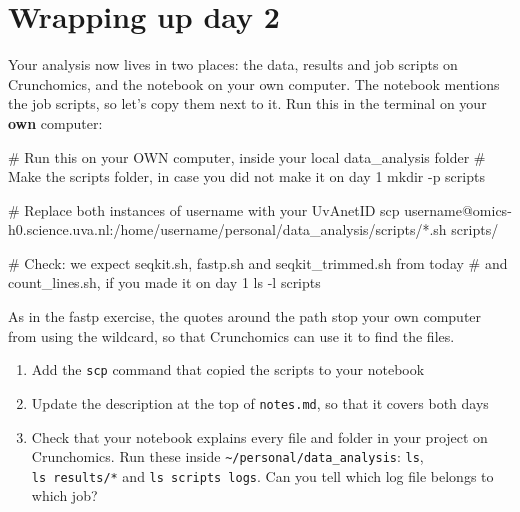 \documentclass[
  letterpaper,
  DIV=11,
  numbers=noendperiod]{scrreprt}
\newenvironment{Shaded}{}{}
\newcommand{\AttributeTok}[1]{\textcolor[rgb]{0.84,0.23,0.29}{#1}}
\newcommand{\CommentTok}[1]{\textcolor[rgb]{0.42,0.45,0.49}{#1}}
\newcommand{\FunctionTok}[1]{\textcolor[rgb]{0.44,0.26,0.76}{#1}}
\newcommand{\NormalTok}[1]{\textcolor[rgb]{0.14,0.16,0.18}{#1}}
\newcommand{\StringTok}[1]{\textcolor[rgb]{0.01,0.18,0.38}{#1}}
\providecommand{\tightlist}{%
  \setlength{\itemsep}{0pt}\setlength{\parskip}{0pt}}
\begin{document}
\section{Wrapping up day 2}\label{wrapping-up-day-2}

Your analysis now lives in two places: the data, results and job scripts
on Crunchomics, and the notebook on your own computer. The notebook
mentions the job scripts, so let's copy them next to it. Run this in the
terminal on your \textbf{own} computer:

\begin{Shaded}
\begin{Highlighting}[]
\CommentTok{\# Run this on your OWN computer, inside your local data\_analysis folder}
\CommentTok{\# Make the scripts folder, in case you did not make it on day 1}
\FunctionTok{mkdir} \AttributeTok{{-}p}\NormalTok{ scripts}

\CommentTok{\# Replace both instances of \textquotesingle{}username\textquotesingle{} with your UvAnetID}
\FunctionTok{scp} \StringTok{\textquotesingle{}username@omics{-}h0.science.uva.nl:/home/username/personal/data\_analysis/scripts/*.sh\textquotesingle{}}\NormalTok{ scripts/}

\CommentTok{\# Check: we expect seqkit.sh, fastp.sh and seqkit\_trimmed.sh from today}
\CommentTok{\# and count\_lines.sh, if you made it on day 1}
\FunctionTok{ls} \AttributeTok{{-}l}\NormalTok{ scripts}
\end{Highlighting}
\end{Shaded}

As in the fastp exercise, the quotes around the path stop your own
computer from using the wildcard, so that Crunchomics can use it to find
the files.

\begin{tcolorbox}[enhanced jigsaw, colbacktitle=quarto-callout-color!10!white, rightrule=.15mm, leftrule=.75mm, colback=white, opacitybacktitle=0.6, title=\textcolor{quarto-callout-color}{\faInfo}\hspace{0.5em}{Notebook checkpoint: Tidy your notebook (day 2)}, bottomrule=.15mm, left=2mm, colframe=quarto-callout-color-frame, opacityback=0, breakable, bottomtitle=1mm, coltitle=black, arc=.35mm, toprule=.15mm, toptitle=1mm, titlerule=0mm]

\begin{enumerate}
\def\labelenumi{\arabic{enumi}.}
\tightlist
\item
  Add the \texttt{scp} command that copied the scripts to your notebook
\item
  Update the description at the top of \texttt{notes.md}, so that it
  covers both days
\item
  Check that your notebook explains every file and folder in your
  project on Crunchomics. Run these inside
  \texttt{\textasciitilde{}/personal/data\_analysis}: \texttt{ls},
  \texttt{ls\ results/*} and \texttt{ls\ scripts\ logs}. Can you tell
  which log file belongs to which job?
\end{enumerate}

\end{tcolorbox}
\end{document}

